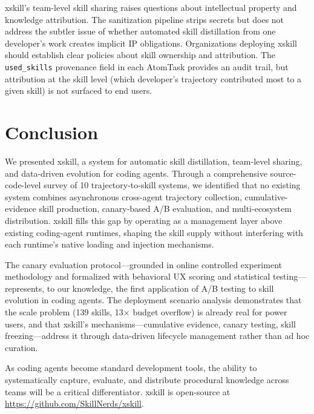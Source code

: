 \documentclass[11pt]{article}
\begin{document}
xskill's team-level skill sharing raises questions about intellectual property and knowledge attribution. The sanitization pipeline strips secrets but does not address the subtler issue of whether automated skill distillation from one developer's work creates implicit IP obligations. Organizations deploying xskill should establish clear policies about skill ownership and attribution. The \texttt{used\_skills} provenance field in each AtomTask provides an audit trail, but attribution at the skill level (which developer's trajectory contributed most to a given skill) is not surfaced to end users.

\section{Conclusion}
\label{sec:conclusion}

We presented xskill, a system for automatic skill distillation, team-level sharing, and data-driven evolution for coding agents. Through a comprehensive source-code-level survey of 10 trajectory-to-skill systems, we identified that no existing system combines asynchronous cross-agent trajectory collection, cumulative-evidence skill production, canary-based A/B evaluation, and multi-ecosystem distribution. xskill fills this gap by operating as a management layer above existing coding-agent runtimes, shaping the skill supply without interfering with each runtime's native loading and injection mechanisms.

The canary evaluation protocol---grounded in online controlled experiment methodology and formalized with behavioral UX scoring and statistical testing---represents, to our knowledge, the first application of A/B testing to skill evolution in coding agents. The deployment scenario analysis demonstrates that the scale problem (139 skills, 13$\times$ budget overflow) is already real for power users, and that xskill's mechanisms---cumulative evidence, canary testing, skill freezing---address it through data-driven lifecycle management rather than ad hoc curation.

As coding agents become standard development tools, the ability to systematically capture, evaluate, and distribute procedural knowledge across teams will be a critical differentiator. xskill is open-source at \url{https://github.com/SkillNerds/xskill}.

\end{document}
